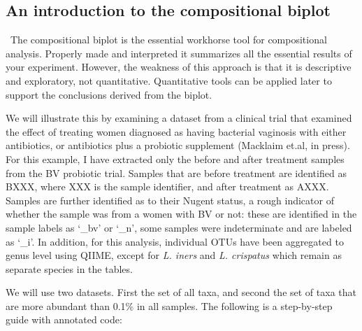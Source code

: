\documentclass[11pt]{article}\usepackage[]{graphicx}\usepackage[]{color}
\begin{document}
\subsection{An introduction to the compositional biplot}\  The compositional biplot is the essential workhorse tool for compositional analysis. Properly made and interpreted it summarizes all the essential results of your experiment. However, the weakness of this approach is that it is descriptive and exploratory, not quantitative. Quantitative tools can be applied later to support the conclusions derived from the biplot. 

We will illustrate this by examining a dataset from a clinical trial that examined the effect of treating women diagnosed as having bacterial vaginosis with either antibiotics, or antibiotics plus a probiotic supplement (Macklaim et.al, in press). For this example, I have extracted only the before and after treatment samples from the BV probiotic trial. Samples that are before treatment are identified as BXXX, where XXX is the sample identifier, and after treatment as AXXX. Samples are further identified as to their Nugent status, a rough indicator of whether the sample was from a women with BV or not: these are identified in the sample labels as `\_bv' or `\_n', some samples were indeterminate and are labeled as `\_i'. In addition, for this analysis,  individual OTUs have been aggregated to genus level using QIIME, except for \emph{L. iners} and \emph{L. crispatus} which remain as separate species in the tables.

We will use two datasets. First the set of all taxa, and second the set of taxa that are more abundant than 0.1\% in all samples. The following is a step-by-step guide with annotated code:
\end{document}

